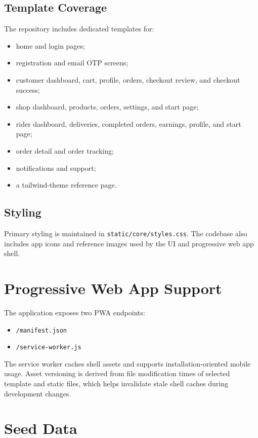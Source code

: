 \documentclass[12pt,a4paper]{article}
\begin{document}
\subsection{Template Coverage}
The repository includes dedicated templates for:
\begin{itemize}[leftmargin=1.5em]
    \item home and login pages;
    \item registration and email OTP screens;
    \item customer dashboard, cart, profile, orders, checkout review, and checkout success;
    \item shop dashboard, products, orders, settings, and start page;
    \item rider dashboard, deliveries, completed orders, earnings, profile, and start page;
    \item order detail and order tracking;
    \item notifications and support;
    \item a tailwind-theme reference page.
\end{itemize}

\subsection{Styling}
Primary styling is maintained in \texttt{static/core/styles.css}. The codebase also includes app icons and reference images used by the UI and progressive web app shell.

\section{Progressive Web App Support}
The application exposes two PWA endpoints:
\begin{itemize}[leftmargin=1.5em]
    \item \texttt{/manifest.json}
    \item \texttt{/service-worker.js}
\end{itemize}

The service worker caches shell assets and supports installation-oriented mobile usage. Asset versioning is derived from file modification times of selected template and static files, which helps invalidate stale shell caches during development changes.

\section{Seed Data}
\end{document}

